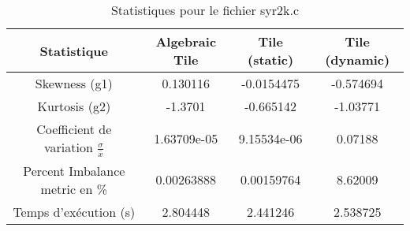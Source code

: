 \documentclass{article}
\begin{document}
\begin{table}[htbp]
  \centering
  \caption{Statistiques pour le fichier syr2k.c}
  \begin{tabular}{|c|c|c|c|}
    \hline
    Statistique & Algebraic Tile & Tile (static) & Tile (dynamic) \\ 
    \hline
    Skewness (g1) & 0.130116 & -0.0154475 & -0.574694 \\ 
    Kurtosis (g2) & -1.3701 & -0.665142 & -1.03771 \\ 
    Coefficient de variation $ \frac{\sigma}{\overline{x}} $ & 1.63709e-05 & 9.15534e-06 & 0.07188\\ 
    Percent Imbalance metric en \% & 0.00263888 & 0.00159764 & 8.62009\\ 
    Temps d'exécution (s) &  2.804448 &  2.441246   &  2.538725   \\ 
    \hline
  \end{tabular}
\end{table}
\newpage

  
\end{document}
